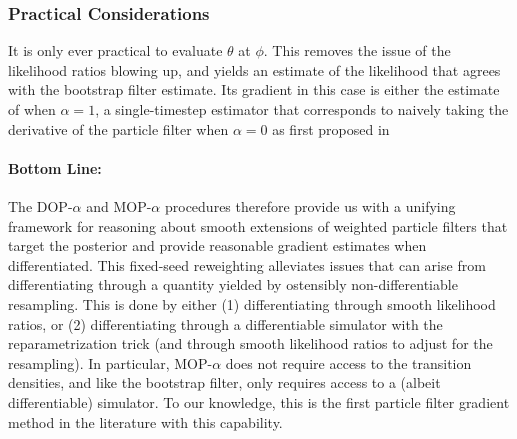 \documentclass{article}
\begin{document}




\subsubsection{Practical Considerations}

It is only ever practical to evaluate $\theta$ at $\phi$. This removes the issue of the likelihood ratios blowing up, and yields an estimate of the likelihood that agrees with the bootstrap filter estimate. Its gradient in this case is either the estimate of \citet{poyiadjis11} when $\alpha=1$, a single-timestep estimator that corresponds to naively taking the derivative of the particle filter when $\alpha=0$ as first proposed in \citet{blei2018vsmc}

\paragraph{Bottom Line:} The DOP-$\alpha$ and MOP-$\alpha$ procedures therefore provide us with a unifying framework for reasoning about smooth extensions of weighted particle filters that target the posterior and provide reasonable gradient estimates when differentiated. This fixed-seed reweighting alleviates issues that can arise from differentiating through a quantity yielded by ostensibly non-differentiable resampling. This is done by either (1) differentiating through smooth likelihood ratios, or (2) differentiating through a differentiable simulator with the reparametrization trick (and through smooth likelihood ratios to adjust for the resampling). In particular, MOP-$\alpha$ does not require access to the transition densities, and like the bootstrap filter, only requires access to a (albeit differentiable) simulator. To our knowledge, this is the first particle filter gradient method in the literature with this capability. 
\end{document}
